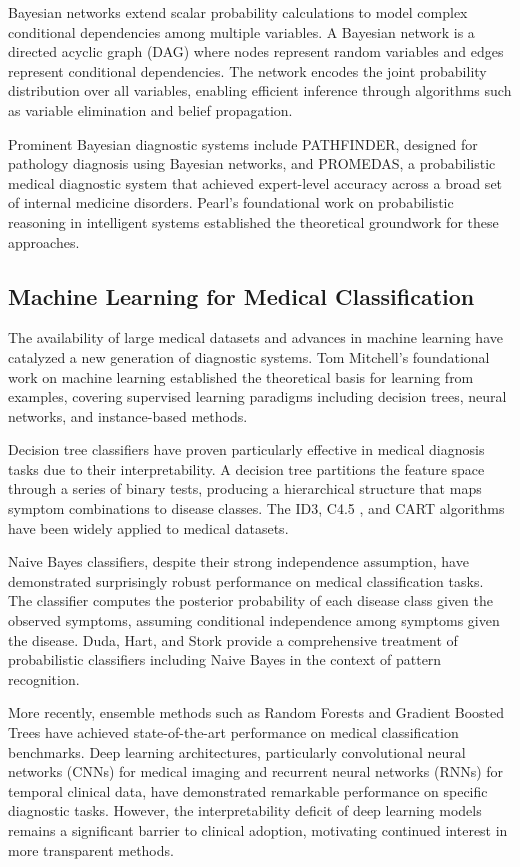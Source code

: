 \documentclass[12pt,a4paper]{article}
\begin{document}
Bayesian networks extend scalar probability calculations to model complex conditional dependencies among multiple variables. A Bayesian network is a directed acyclic graph (DAG) where nodes represent random variables and edges represent conditional dependencies. The network encodes the joint probability distribution over all variables, enabling efficient inference through algorithms such as variable elimination and belief propagation.

Prominent Bayesian diagnostic systems include PATHFINDER, designed for pathology diagnosis using Bayesian networks, and PROMEDAS, a probabilistic medical diagnostic system that achieved expert-level accuracy across a broad set of internal medicine disorders. Pearl's foundational work on probabilistic reasoning in intelligent systems \cite{pearl} established the theoretical groundwork for these approaches.

\subsection{Machine Learning for Medical Classification}

The availability of large medical datasets and advances in machine learning have catalyzed a new generation of diagnostic systems. Tom Mitchell's foundational work \cite{mitchell} on machine learning established the theoretical basis for learning from examples, covering supervised learning paradigms including decision trees, neural networks, and instance-based methods.

Decision tree classifiers have proven particularly effective in medical diagnosis tasks due to their interpretability. A decision tree partitions the feature space through a series of binary tests, producing a hierarchical structure that maps symptom combinations to disease classes. The ID3, C4.5 \cite{quinlan}, and CART \cite{breiman} algorithms have been widely applied to medical datasets.

Naive Bayes classifiers, despite their strong independence assumption, have demonstrated surprisingly robust performance on medical classification tasks. The classifier computes the posterior probability of each disease class given the observed symptoms, assuming conditional independence among symptoms given the disease. Duda, Hart, and Stork \cite{duda} provide a comprehensive treatment of probabilistic classifiers including Naive Bayes in the context of pattern recognition.

More recently, ensemble methods such as Random Forests and Gradient Boosted Trees have achieved state-of-the-art performance on medical classification benchmarks. Deep learning architectures, particularly convolutional neural networks (CNNs) for medical imaging and recurrent neural networks (RNNs) for temporal clinical data, have demonstrated remarkable performance on specific diagnostic tasks. However, the interpretability deficit of deep learning models remains a significant barrier to clinical adoption, motivating continued interest in more transparent methods.
\end{document}
